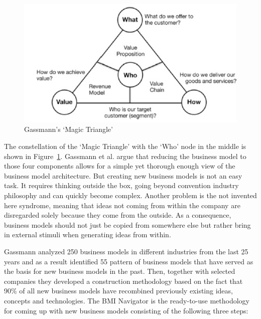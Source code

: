 		\begin{figure}[ht]
		    \begin{center}
		    \includegraphics[scale=0.6]{Talk11/Figure1.png}
		    \end{center}
		    \caption{Gassmann's `Magic Triangle' \cite[p.~91]{gassmann55}}
		    \label{fig:m_triangle}
		\end{figure}

		The constellation of the `Magic Triangle' with the `Who' node in the middle is shown in Figure~\ref{fig:m_triangle}. Gassmann et al. argue that reducing the business model to those four components allows for a simple yet thorough enough view of the business model architecture. But creating new business models is not an easy task. It requires thinking outside the box, going beyond convention industry philosophy and can quickly become complex. Another problem is the not invented here syndrome, meaning that ideas not coming from within the company are disregarded solely because they come from the outside. As a consequence, business models should not just be copied from somewhere else but rather bring in external stimuli when generating ideas from within.

		Gassmann analyzed 250 business models in different industries from the last 25 years and as a result identified 55 pattern of business models that have served as the basis for new business models in the past. Then, together with selected companies they developed a construction methodology based on the fact that 90\% of all new business models have recombined previously existing ideas, concepts and  technologies. The BMI Navigator is the ready-to-use methodology for coming up with new business models consisting of the following three steps:

